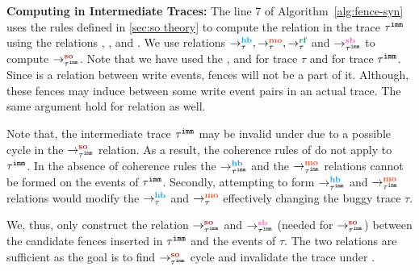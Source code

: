 \noindent\textbf{Computing \lso in Intermediate Traces:} 
The line 7 of Algorithm~\ref{alg:fence-syn} uses the rules defined in 
\textsection\ref{sec:so theory} to compute the \lso relation in the trace 
$ {\tau}^{\mathtt{imm}} $ using the relations \lhb, \lmo, \lrf and \lsb. 
We use relations $ \setHB, \setMO, \setRF $ and $ \seqb{\imm{\tau}}{}{} $ to compute $ \so{\imm{\tau}}{}{} $.
Note that we have used the \lhb, \lmo and \lrf for trace $ \tau $ and \lsb 
for trace $ {\tau}^{\mathtt{imm}} $. 
Since \lmo is a relation between write events, fences will not be a part 
of it. Although, these fences may induce \lmo between some write event 
pairs in an actual trace. 
The same argument hold for \lrf relation as well.
 
\newline
Note that, the intermediate trace ${\tau}^{\mathtt{imm}}$ may be invalid under 
\cc due to a possible cycle in the $\so{\imm{\tau}}{}{}$ relation. 
As a result, the coherence rules of \cc do not apply to ${\tau}^{\mathtt{imm}}$. 
In the absence of \cc coherence rules the $\hb{\imm{\tau}}{}{}$ and 
the $\mo{\imm{\tau}}{}{}$ relations cannot be formed on the events of 
${\tau}^{\mathtt{imm}}$.
%
Secondly, attempting to form $\hb{\imm{\tau}}{}{}$ and 
$\mo{\imm{\tau}}{}{}$ relations would modify the $\setHB$ and $\setMO$
effectively changing the buggy trace $\tau$.

We, thus, only construct the relation $\so{\imm{\tau}}{}{}$ and 
$\seqb{\imm{\tau}}{}{}$ (needed for $\so{\imm{\tau}}{}{}$) 
between the candidate fences inserted in ${\tau}^{\mathtt{imm}}$ and the events
of $\tau$. The two relations are sufficient as the goal is to
find $\so{\imm{\tau}}{}{}$ cycle and invalidate the trace under \cc.


